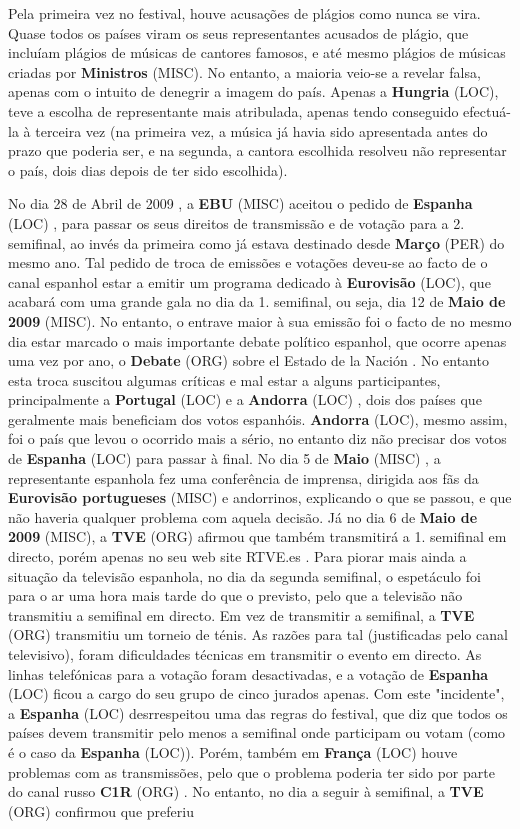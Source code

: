 \documentclass[12pt,a4paper]{article}
\begin{document}
Pela primeira vez no festival, houve acusações de plágios como nunca se vira. Quase todos os países viram os seus representantes acusados de plágio, que incluíam plágios de músicas de cantores famosos, e até mesmo plágios de músicas criadas por \textbf{Ministros} (MISC). No entanto, a maioria veio-se a revelar falsa, apenas com o intuito de denegrir a imagem do país. Apenas a \textbf{Hungria} (LOC), teve a escolha de representante mais atribulada, apenas tendo conseguido efectuá-la à terceira vez (na primeira vez, a música já havia sido apresentada antes do prazo que poderia ser, e na segunda, a cantora escolhida resolveu não representar o país, dois dias depois de ter sido escolhida).

No dia 28 de Abril de 2009 , a \textbf{EBU} (MISC) aceitou o pedido de \textbf{Espanha} (LOC) , para passar os seus direitos de transmissão e de votação para a 2. semifinal, ao invés da primeira como já estava destinado desde \textbf{Março} (PER) do mesmo ano. Tal pedido de troca de emissões e votações deveu-se ao facto de o canal espanhol estar a emitir um programa dedicado à \textbf{Eurovisão} (LOC), que acabará com uma grande gala no dia da 1. semifinal, ou seja, dia 12 de \textbf{Maio de 2009} (MISC). No entanto, o entrave maior à sua emissão foi o facto de no mesmo dia estar marcado o mais importante debate político espanhol, que ocorre apenas uma vez por ano, o \textbf{Debate} (ORG) sobre el Estado de la Nación . No entanto esta troca suscitou algumas críticas e mal estar a alguns participantes, principalmente a \textbf{Portugal} (LOC) e a \textbf{Andorra} (LOC) , dois dos países que geralmente mais beneficiam dos votos espanhóis. \textbf{Andorra} (LOC), mesmo assim, foi o país que levou o ocorrido mais a sério, no entanto diz não precisar dos votos de \textbf{Espanha} (LOC) para passar à final. No dia 5 de \textbf{Maio} (MISC) , a representante espanhola fez uma conferência de imprensa, dirigida aos fãs da \textbf{Eurovisão portugueses} (MISC) e andorrinos, explicando o que se passou, e que não haveria qualquer problema com aquela decisão. Já no dia 6 de \textbf{Maio de 2009} (MISC), a \textbf{TVE} (ORG) afirmou que também transmitirá a 1. semifinal em directo, porém apenas no seu web site RTVE.es . Para piorar mais ainda a situação da televisão espanhola, no dia da segunda semifinal, o espetáculo foi para o ar uma hora mais tarde do que o previsto, pelo que a televisão não transmitiu a semifinal em directo. Em vez de transmitir a semifinal, a \textbf{TVE} (ORG) transmitiu um torneio de ténis. As razões para tal (justificadas pelo canal televisivo), foram dificuldades técnicas em transmitir o evento em directo. As linhas telefónicas para a votação foram desactivadas, e a votação de \textbf{Espanha} (LOC) ficou a cargo do seu grupo de cinco jurados apenas. Com este "incidente", a \textbf{Espanha} (LOC) desrrespeitou uma das regras do festival, que diz que todos os países devem transmitir pelo menos a semifinal onde participam ou votam (como é o caso da \textbf{Espanha} (LOC)). Porém, também em \textbf{França} (LOC) houve problemas com as transmissões, pelo que o problema poderia ter sido por parte do canal russo \textbf{C1R} (ORG) . No entanto, no dia a seguir à semifinal, a \textbf{TVE} (ORG) confirmou que preferiu 
\end{document}
